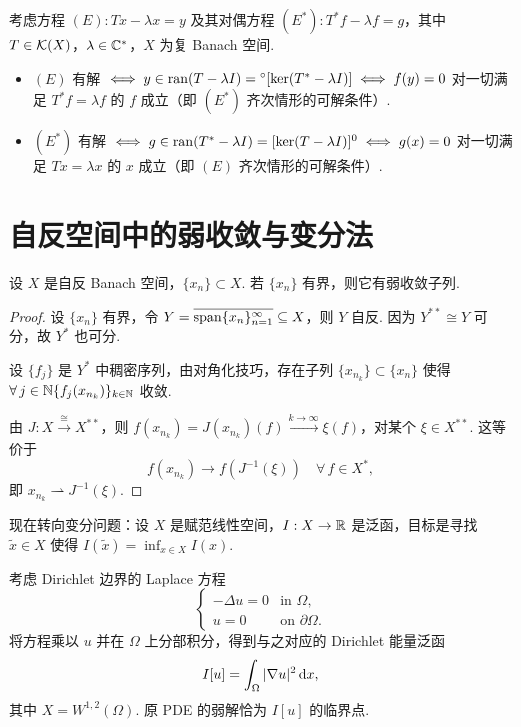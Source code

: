 \begin{lemma}\label{lem:fredholm-alternative}
考虑方程 $(E): Tx - \lambda x = y$ 及其对偶方程 $(E^*): T^*f - \lambda f = g$，其中 $T \in \mathcal{K}(X)$，$\lambda \in \mathbb{C}^*$，$X$ 为复 Banach 空间.
\begin{itemize}
    \item $(E)$ 有解 $\iff y \in \operatorname{ran}(T-\lambda I) = {}^\circ[\ker(T^*-\lambda I)] \iff f(y)=0$ 对一切满足 $T^*f = \lambda f$ 的 $f$ 成立（即 $(E^*)$ 齐次情形的可解条件）.
    \item $(E^*)$ 有解 $\iff g \in \operatorname{ran}(T^*-\lambda I) = [\ker(T-\lambda I)]^0 \iff g(x)=0$ 对一切满足 $Tx = \lambda x$ 的 $x$ 成立（即 $(E)$ 齐次情形的可解条件）.
\end{itemize}
\end{lemma}

\section{自反空间中的弱收敛与变分法}

\begin{theorem}[自反空间中的弱紧性]\label{thm:weak-compact-reflexive}
设 $X$ 是自反 Banach 空间，$\{x_n\} \subset X$. 若 $\{x_n\}$ 有界，则它有弱收敛子列.
\end{theorem}

\begin{proof}
设 $\{x_n\}$ 有界，令 $Y = \overline{\operatorname{span}\{x_n\}_{n=1}^\infty} \subseteq X$，则 $Y$ 自反. 因为 $Y^{**} \cong Y$ 可分，故 $Y^*$ 也可分.\par
设 $\{f_j\}$ 是 $Y^*$ 中稠密序列，由对角化技巧，存在子列 $\{x_{n_k}\} \subset \{x_n\}$ 使得 $\forall\, j \in \mathbb{N}\{f_j(x_{n_k})\}_{k \in \mathbb{N}}$ 收敛.\par
由 $J: X \xrightarrow{\cong} X^{**}$，则 $f(x_{n_k}) = J(x_{n_k})(f) \xrightarrow{k \to \infty} \xi(f)$，对某个 $\xi \in X^{**}$. 这等价于
\begin{equation*}
f(x_{n_k}) \to f(J^{-1}(\xi))\quad \forall\, f \in X^*,
\end{equation*}
即 $x_{n_k} \rightharpoonup J^{-1}(\xi)$.
\end{proof}

现在转向变分问题：设 $X$ 是赋范线性空间，$I: X \to \mathbb{R}$ 是泛函，目标是寻找 $\tilde{x} \in X$ 使得 $I(\tilde{x}) = \inf_{x \in X} I(x)$.

\begin{instance}
考虑 Dirichlet 边界的 Laplace 方程
\begin{equation*}
\begin{cases}
-\Delta u = 0 & \text{in } \Omega,\\
u = 0 & \text{on } \partial\Omega.
\end{cases}
\end{equation*}
将方程乘以 $u$ 并在 $\Omega$ 上分部积分，得到与之对应的 Dirichlet 能量泛函
\begin{equation*}
I[u] = \int_\Omega |\nabla u|^2 \mathop{}\!\mathrm{d} x,
\end{equation*}
其中 $X = W^{1,2}(\Omega)$. 原 PDE 的弱解恰为 $I[u]$ 的临界点.
\end{instance}

